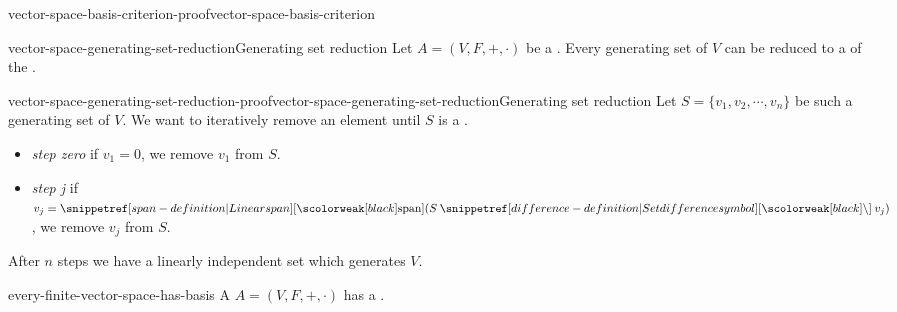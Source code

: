 \documentclass[preview]{standalone}
\begin{document}
\begin{snippetproof}{vector-space-basis-criterion-proof}{vector-space-basis-criterion}{}
\end{snippetproof}

\begin{snippetproposition}{vector-space-generating-set-reduction}{Generating set reduction}
    Let \(A=(V, F, +, \cdot)\) be a \vectorspace.
    Every generating set of \(V\) can be reduced to a \basis of the \vectorspace.
\end{snippetproposition}

\begin{snippetproof}{vector-space-generating-set-reduction-proof}{vector-space-generating-set-reduction}{Generating set reduction}
    Let \(S = \{v_1, v_2, \cdots, v_n\}\) be such a generating set of \(V\).
    We want to iteratively remove an element until \(S\) is a \basis.
    \begin{itemize}
        \item \emph{step zero} if \(v_1 = 0\), we remove \(v_1\) from \(S\).
        \item \emph{step j} if \(v_j = \linearspan(S \difference v_j)\), we remove \(v_j\) from \(S\).
    \end{itemize}
    After \(n\) steps we have a linearly independent set which generates \(V\).
\end{snippetproof}

\begin{snippetcorollary}{every-finite-vector-space-has-basis}{}
    A \vectorspace \(A=(V, F, +, \cdot)\) has a \basis.
\end{snippetcorollary}
\end{document}
